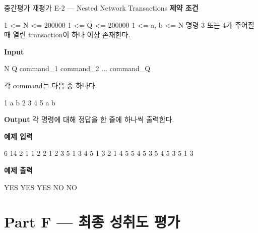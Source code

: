 \begin{problembox}{중간평가 재평가 E-2 --- Nested Network Transactions}
\textbf{제약 조건}
\begin{TextBlock}
1 <= N <= 200000
1 <= Q <= 200000
1 <= a, b <= N
명령 3 또는 4가 주어질 때 열린 transaction이 하나 이상 존재한다.
\end{TextBlock}

\textbf{Input}
\begin{TextBlock}
N Q
command_1
command_2
...
command_Q
\end{TextBlock}

각 command는 다음 중 하나다.
\begin{TextBlock}
1 a b
2
3
4
5 a b
\end{TextBlock}

\textbf{Output}
각  명령에 대해 정답을 한 줄에 하나씩 출력한다.

\textbf{예제 입력}
\begin{TextBlock}
6 14
2
1 1 2
2
1 2 3
5 1 3
4
5 1 3
2
1 4 5
5 4 5
3
5 4 5
3
5 1 3
\end{TextBlock}

\textbf{예제 출력}
\begin{TextBlock}
YES
YES
YES
NO
NO
\end{TextBlock}
\end{problembox}

\section{Part F --- 최종 성취도 평가}

